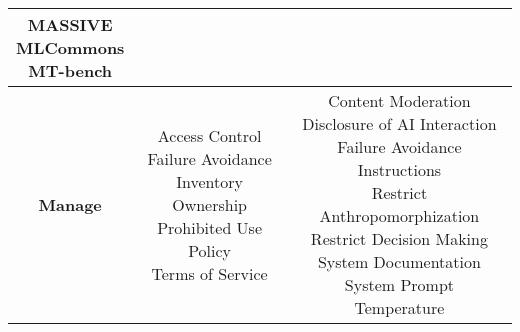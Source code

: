 \documentclass[fleqn]{article}
\begin{document}
\begin{table}[H]
\begin{tabular}{|c|c|c|}
{			\textbullet\hspace{3pt} MASSIVE \\ 
			\textbullet\hspace{3pt} MLCommons \\ 
			\textbullet\hspace{3pt} MT-bench  \\ 
		}
		\\ 
		\hline		
		\textbf{Manage} &
		\makecell[l]{ 
			\textbullet\hspace{3pt} Access Control \\ 
			\textbullet\hspace{3pt} Failure Avoidance \\ 
			\textbullet\hspace{3pt} Inventory\\ 	
			\textbullet\hspace{3pt} Ownership\\ 	
			\textbullet\hspace{3pt} Prohibited Use Policy \\ 
			\textbullet\hspace{3pt} Terms of Service \\ 
		}		
		&
		\makecell[l]{ 
			\textbullet\hspace{3pt} Content Moderation \\ 
			\textbullet\hspace{3pt} Disclosure of AI Interaction \\ 
			\textbullet\hspace{3pt} Failure Avoidance \\
			\textbullet\hspace{3pt} Instructions\\ 	
			\textbullet\hspace{3pt} Restrict Anthropomorphization \\			
			\textbullet\hspace{3pt} Restrict Decision Making \\ 					 
			\textbullet\hspace{3pt} System Documentation\\ 			
			\textbullet\hspace{3pt} System Prompt \\ 
			\textbullet\hspace{3pt} Temperature \\ 
		}	
		\\
		\hline
	\end{tabular}
	\label{table:low_risk_plan_by_gai_risk}
\end{table}
\end{document}
